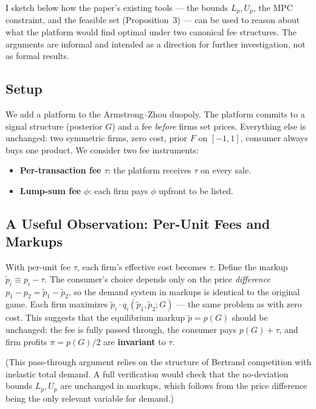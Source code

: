 \documentclass[12pt, a4paper]{article}
\begin{document}
I sketch below how the paper's existing tools --- the bounds $L_p, U_p$, the MPC constraint, and the feasible set (Proposition~3) --- can be used to reason about what the platform would find optimal under two canonical fee structures. The arguments are informal and intended as a direction for further investigation, not as formal results.

\subsection{Setup}

We add a platform to the Armstrong--Zhou duopoly. The platform commits to a signal structure (posterior $G$) and a fee \emph{before} firms set prices. Everything else is unchanged: two symmetric firms, zero cost, prior $F$ on $[-1,1]$, consumer always buys one product. We consider two fee instruments:

\begin{itemize}[nosep]
    \item \textbf{Per-transaction fee $\tau$}: the platform receives $\tau$ on every sale.
    \item \textbf{Lump-sum fee $\phi$}: each firm pays $\phi$ upfront to be listed.
\end{itemize}

\subsection{A Useful Observation: Per-Unit Fees and Markups}

With per-unit fee $\tau$, each firm's effective cost becomes $\tau$. Define the markup $\tilde{p}_i \equiv p_i - \tau$. The consumer's choice depends only on the price \emph{difference} $p_1 - p_2 = \tilde{p}_1 - \tilde{p}_2$, so the demand system in markups is identical to the original game. Each firm maximizes $\tilde{p}_i \cdot q_i(\tilde{p}_1, \tilde{p}_2; G)$ --- the same problem as with zero cost. This suggests that the equilibrium markup $\tilde{p} = p(G)$ should be unchanged: the fee is fully passed through, the consumer pays $p(G) + \tau$, and firm profits $\pi = p(G)/2$ are \textbf{invariant} to $\tau$.

(This pass-through argument relies on the structure of Bertrand competition with inelastic total demand. A full verification would check that the no-deviation bounds $L_p, U_p$ are unchanged in markups, which follows from the price difference being the only relevant variable for demand.)
\end{document}
